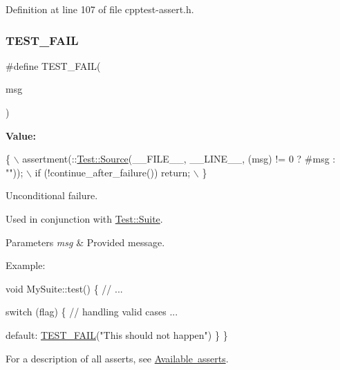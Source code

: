 Definition at line 107 of file cpptest-\/assert.\+h.

\mbox{\label{cpptest-assert_8h_a947ab44cc42369eb7cfe33f8a1e38e4b}} 
\subsubsection{\texorpdfstring{T\+E\+S\+T\+\_\+\+F\+A\+IL}{TEST\_FAIL}}
{\footnotesize\ttfamily \#define T\+E\+S\+T\+\_\+\+F\+A\+IL(\begin{DoxyParamCaption}\item[{}]{msg }\end{DoxyParamCaption})}

{\bfseries Value\+:}
\begin{DoxyCode}
\{                                                               \(\backslash\)
        assertment(::\mbox{\hyperlink{class_test_1_1_source}{Test::Source}}(\_\_FILE\_\_, \_\_LINE\_\_, (msg) != 0 ? #msg : \textcolor{stringliteral}{""})); \(\backslash\)
        if (!continue\_after\_failure()) return;                      \(\backslash\)
    \}
\end{DoxyCode}
Unconditional failure.

Used in conjunction with \mbox{\hyperlink{class_test_1_1_suite}{Test\+::\+Suite}}.


\begin{DoxyParams}{Parameters}
{\em msg} & Provided message.\\
\hline
\end{DoxyParams}
\begin{DoxyParagraph}{Example\+:}

\begin{DoxyCode}
\textcolor{keywordtype}{void} MySuite::test()
\{
    \textcolor{comment}{// ...}

    \textcolor{keywordflow}{switch} (flag)
    \{
        \textcolor{comment}{// handling valid cases ...}

        \textcolor{keywordflow}{default}:
            \mbox{\hyperlink{cpptest-assert_8h_a947ab44cc42369eb7cfe33f8a1e38e4b}{TEST\_FAIL}}(\textcolor{stringliteral}{"This should not happen"})
    \}
\}
\end{DoxyCode}

\end{DoxyParagraph}
For a description of all asserts, see \mbox{\hyperlink{asserts}{Available asserts}}. 


